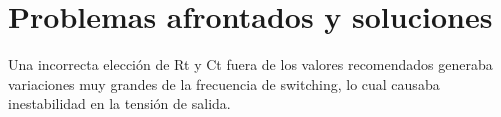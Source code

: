 \section{Problemas afrontados y soluciones}

Una incorrecta elección de Rt y Ct fuera de los valores recomendados generaba variaciones muy grandes de la frecuencia de switching, 
lo cual causaba inestabilidad en la tensión de salida. 


